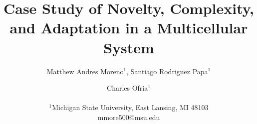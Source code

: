\documentclass[letterpaper]{article}
\title{Case Study of Novelty, Complexity, and Adaptation in a Multicellular System}
\author{Matthew Andres Moreno$^{1}$, Santiago Rodriguez Papa$^{1}$ \and Charles Ofria$^{1}$ \\
\mbox{}\\
$^1$Michigan State University, East Lansing, MI 48103 \\
mmore500@msu.edu} %
\begin{document}
\maketitle







\footnotesize


\clearpage
\newpage

\appendix


\end{document}
